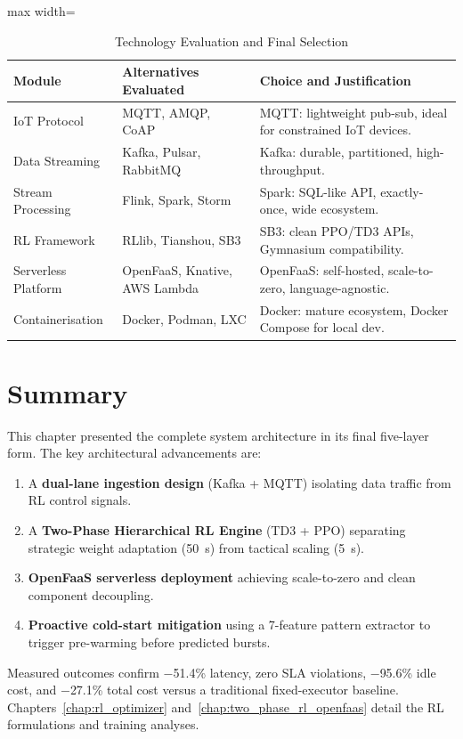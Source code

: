 \begin{table}[H]
\centering
\caption{Technology Evaluation and Final Selection}
\label{tab:tech_choices}
\begin{adjustbox}{max width=\textwidth}
\begin{tabular}{|p{3cm}|p{3.5cm}|p{7cm}|}
\hline
\textbf{Module}       & \textbf{Alternatives Evaluated}       & \textbf{Choice and Justification} \\ \hline
IoT Protocol          & MQTT, AMQP, CoAP                      & MQTT: lightweight pub-sub, ideal for constrained IoT devices. \\ \hline
Data Streaming        & Kafka, Pulsar, RabbitMQ               & Kafka: durable, partitioned, high-throughput. \\ \hline
Stream Processing     & Flink, Spark, Storm                   & Spark: SQL-like API, exactly-once, wide ecosystem. \\ \hline
RL Framework          & RLlib, Tianshou, SB3                  & SB3: clean PPO/TD3 APIs, Gymnasium compatibility. \\ \hline
Serverless Platform   & OpenFaaS, Knative, AWS Lambda         & OpenFaaS: self-hosted, scale-to-zero, language-agnostic. \\ \hline
Containerisation      & Docker, Podman, LXC                   & Docker: mature ecosystem, Docker Compose for local dev. \\ \hline
\end{tabular}
\end{adjustbox}
\end{table}

\section{Summary}
This chapter presented the complete system architecture in its final five-layer form.
The key architectural advancements are:
\begin{enumerate}
  \item A \textbf{dual-lane ingestion design} (Kafka + MQTT) isolating data traffic
        from RL control signals.
  \item A \textbf{Two-Phase Hierarchical RL Engine} (TD3 + PPO) separating strategic
        weight adaptation (50~s) from tactical scaling (5~s).
  \item \textbf{OpenFaaS serverless deployment} achieving scale-to-zero and clean
        component decoupling.
  \item \textbf{Proactive cold-start mitigation} using a 7-feature pattern extractor
        to trigger pre-warming before predicted bursts.
\end{enumerate}

\noindent Measured outcomes confirm $-$51.4\% latency, zero SLA violations, $-$95.6\%
idle cost, and $-$27.1\% total cost versus a traditional fixed-executor baseline.
Chapters~\ref{chap:rl_optimizer} and~\ref{chap:two_phase_rl_openfaas} detail the RL
formulations and training analyses.
